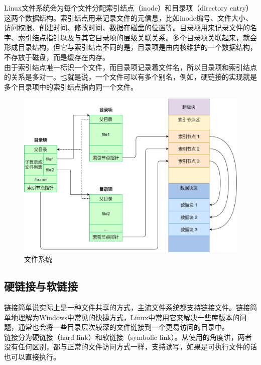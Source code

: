 Linux文件系统会为每个文件分配索引结点（inode）和目录项（directory entry）这两个数据结构。索引结点用来记录文件的元信息，比如inode编号、文件大小、访问权限、创建时间、修改时间、数据在磁盘的位置等。目录项用来记录文件的名字、索引结点指针以及与其它目录项的层级关联关系。多个目录项关联起来，就会形成目录结构，但它与索引结点不同的是，目录项是由内核维护的一个数据结构，不存放于磁盘，而是缓存在内存。\\

由于索引结点唯一标识一个文件，而目录项记录着文件名，所以目录项和索引结点的关系是多对一。也就是说，一个文件可以有多个别名，例如，硬链接的实现就是多个目录项中的索引结点指向同一个文件。

\begin{figure}[H]
    \centering
    \includegraphics[scale=0.35]{img/C5/5-3/1.png}
    \caption{文件系统}
\end{figure}

\vspace{0.5cm}

\subsection{硬链接与软链接}

链接简单说实际上是一种文件共享的方式，主流文件系统都支持链接文件。链接简单地理解为Windows中常见的快捷方式，Linux中常用它来解决一些库版本的问题，通常也会将一些目录层次较深的文件链接到一个更易访问的目录中。\\

链接分为硬链接（hard link）和软链接（symbolic link）。从使用的角度讲，两者没有任何区别，都与正常的文件访问方式一样，支持读写，如果是可执行文件的话也可以直接执行。\\

